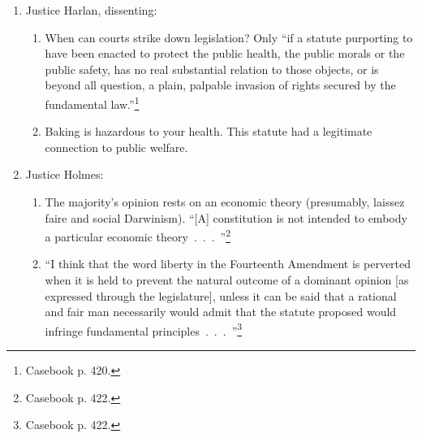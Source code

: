 \begin{enumerate}
\begin{enumerate}
        connection to public health. There is no such connection here. Baking 
        is not inherently unhealthy, and such regulations ``cripple the 
        ability of the laborer to support himself and his 
        family.''\footnote{Casebook p. 419.}
        \item If the principle is to keep the populace healthy and robust, 
        then the state would have the power to regulate the exertion of all 
        citizens---for instance, athletes.
        \item Defendant also argued that longer hours led to unclean bread. 
        The Court disagreed.
        \item ``It seems to us that the real object and purpose were simply to 
        regulate the hours of labor between the master and his employ\'{e}s 
        (all being men, sui juris), in a private business, not dangerous in 
        any degree to morals or in any real and substantial degree, to the 
        health of the employees.''\footnote{Casebook p. 420.}
    \end{enumerate}
    \item Justice Harlan, dissenting:
    \begin{enumerate}
        \item When can courts strike down legislation? Only ``if a statute 
        purporting to have been enacted to protect the public health, the 
        public morals or the public safety, has no real substantial relation 
        to those objects, or is beyond all question, a plain, palpable 
        invasion of rights secured by the fundamental law.''\footnote{Casebook 
        p. 420.}
        \item Baking is hazardous to your health. This statute had a 
        legitimate connection to public welfare.
    \end{enumerate}
    \item Justice Holmes:
    \begin{enumerate}
        \item The majority's opinion rests on an economic theory (presumably, 
        laissez faire and social Darwinism). ``[A] constitution is not 
        intended to embody a particular economic 
        theory~.~.~.~''\footnote{Casebook p. 422.}
        \item ``I think that the word liberty in the Fourteenth Amendment is 
        perverted when it is held to prevent the natural outcome of a dominant 
        opinion [as expressed through the legislature], unless it can be said 
        that a rational and fair man necessarily would admit that the statute 
        proposed would infringe fundamental 
        principles~.~.~.~''\footnote{Casebook p. 422.}
    \end{enumerate}
\end{enumerate}

